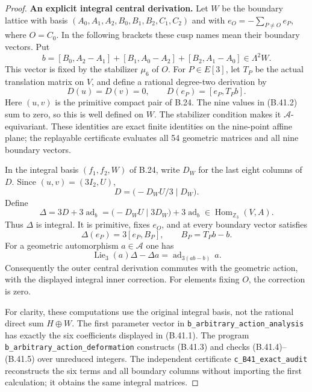 \begin{proof}

\par\smallskip\noindent\textbf{An explicit integral central derivation.}\enspace
Let $W$ be the boundary lattice with basis
$(A_0,A_1,A_2,B_0,B_1,B_2,C_1,C_2)$ and with
$e_O=-\sum_{P\ne O}e_P$, where $O=C_0$.  In the following
brackets these cusp names mean their boundary vectors.  Put
\[
 b=[B_0,A_2-A_1]+[B_1,A_0-A_2]+[B_2,A_1-A_0]
       \in\Lambda^2W.                                      \tag{B.41.1}
\]
This vector is fixed by the stabilizer $\mu_6$ of $O$.
For $P\in E[3]$, let $T_P$ be the actual translation matrix on
$V$, and define a rational degree-two derivation by
\[
 D(u)=D(v)=0,\qquad D(e_P)=[e_P,T_Pb].                       \tag{B.41.2}
\]
Here $(u,v)$ is the primitive compact pair of B.24.  The nine
values in (B.41.2) sum to zero, so this is well defined on $W$.
The stabilizer condition makes it $\mathcal A$-equivariant.
These identities are exact finite identities on the nine-point
affine plane; the replayable certificate evaluates all 54
geometric matrices and all nine boundary vectors.

In the integral basis $(f_1,f_2,W)$ of B.24, write $D_W$ for
the last eight columns of $D$.  Since $(u,v)=(3I_2,U)$,
\[
 D=\bigl(-D_WU/3\mid D_W\bigr).
\]
Define
\[
 \Delta=3D+3\operatorname{ad}_b
       =\bigl(-D_WU\mid3D_W\bigr)+3\operatorname{ad}_b
       \in\operatorname{Hom}_{\mathbb Z_3}(V,A).             \tag{B.41.3}
\]
Thus $\Delta$ is integral.  It is primitive, fixes $e_O$, and
at every boundary vector satisfies
\[
 \Delta(e_P)=3[e_P,B_P],\qquad B_P=T_Pb-b.                  \tag{B.41.4}
\]
For a geometric automorphism $a\in\mathcal A$ one has
\[
 \operatorname{Lie}_3(a)\Delta-\Delta a
    =\operatorname{ad}_{3(ab-b)}\,a.                       \tag{B.41.5}
\]
Consequently the outer central derivation commutes with the
geometric action, with the displayed integral inner correction.
For elements fixing $O$, the correction is zero.

For clarity, these computations use the original integral
basis, not the rational direct sum $H\oplus W$.  The first
parameter vector in \texttt{b\_arbitrary\_action\_analysis}
has exactly the six coefficients displayed in (B.41.1).
The program \texttt{b\_arbitrary\_action\_deformation}
constructs (B.41.3) and checks (B.41.4)--(B.41.5) over
unreduced integers.  The independent certificate
\texttt{c\_B41\_exact\_audit} reconstructs the six terms
and all boundary columns without importing the first
calculation; it obtains the same integral matrices.


\end{proof}
